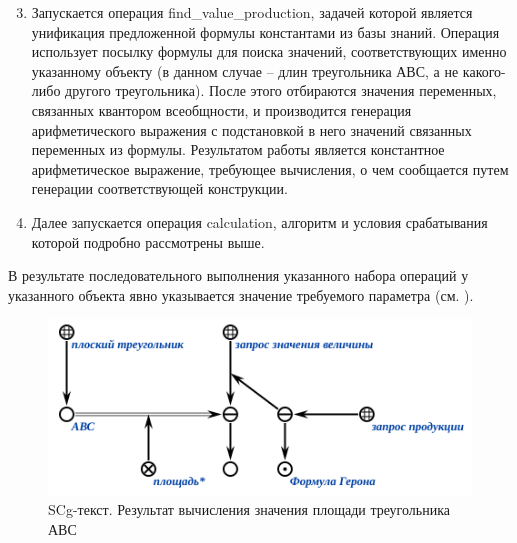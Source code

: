 \begin{enumerate}
	\setcounter{enumi}{2}
	\item
	Запускается операция find\_value\_production, задачей которой является унификация предложенной формулы константами из базы знаний. Операция использует посылку формулы для поиска значений, соответствующих именно указанному объекту (в данном случае -- длин треугольника АВС, а не какого-либо другого треугольника). После этого отбираются значения переменных, связанных квантором всеобщности, и производится генерация арифметического выражения с подстановкой в него значений связанных переменных из формулы. Результатом работы является константное арифметическое выражение, требующее вычисления, о чем сообщается путем генерации соответствующей конструкции.
	\item
	Далее запускается операция calculation, алгоритм и условия срабатывания которой подробно рассмотрены выше.
\end{enumerate}

В результате последовательного выполнения указанного набора операций у указанного объекта явно указывается значение требуемого параметра (см. ).

\begin{figure}[H]
	\includegraphics[scale=0.85]{images/part7/chapter_learning_systems/step4-kbe.png}
	\caption{SCg-текст. Результат вычисления значения площади треугольника АВС}
	\label{fig:step4}
\end{figure}
